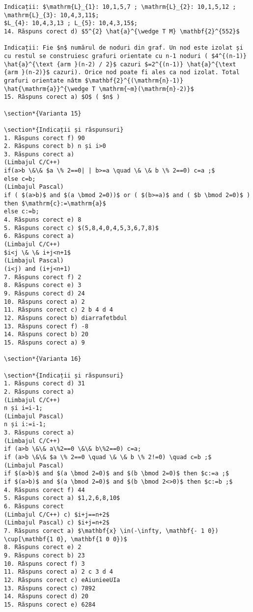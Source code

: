 \begin{verbatim}
Indicații: $\mathrm{L}_{1}: 10,1,5,7 ; \mathrm{L}_{2}: 10,1,5,12 ; \mathrm{L}_{3}: 10,4,3,11$;
$L_{4}: 10,4,3,13 ; L_{5}: 10,4,3,15$;
14. Răspuns corect d) $5^{2} \hat{a}^{\wedge T M} \mathbf{2}^{552}$

Indicații: Fie $n$ numărul de noduri din graf. Un nod este izolat și cu restul se construiesc grafuri orientate cu n-1 noduri ( $4^{(n-1)} \hat{a}^{\text {arm }(n-2) / 2}$ cazuri $=2^{(n-1)} \hat{a}^{\text {arm }(n-2)}$ cazuri). Orice nod poate fi ales ca nod izolat. Total grafuri orientate nâtm $\mathbf{2}^{(\mathrm{n}-1)} \hat{\mathrm{a}}^{\wedge T \mathrm{~m}(\mathrm{n}-2)}$
15. Răspuns corect a) $O$ ( $n$ )

\section*{Varianta 15}

\section*{Indicații și răspunsuri}
1. Răspuns corect f) 90
2. Răspuns corect b) n și i>0
3. Răspuns corect a)
(Limbajul C/C++)
if(a>b \&\& $a \% 2==0| | b>=a \quad \& \& b \% 2==0) c=a ;$
else c=b;
(Limbajul Pascal)
if ( $(a>b)$ and $(a \bmod 2=0))$ or ( $(b>=a)$ and ( $b \bmod 2=0)$ )
then $\mathrm{c}:=\mathrm{a}$
else c:=b;
4. Răspuns corect e) 8
5. Răspuns corect c) $(5,8,4,0,4,5,3,6,7,8)$
6. Răspuns corect a)
(Limbajul C/C++)
$i<j \& \& i+j<n+1$
(Limbajul Pascal)
(i<j) and (i+j<n+1)
7. Răspuns corect f) 2
8. Răspuns corect e) 3
9. Răspuns corect d) 24
10. Răspuns corect a) 2
11. Răspuns corect c) 2 b 4 d 4
12. Răspuns corect b) diarrafetbdul
13. Răspuns corect f) -8
14. Răspuns corect b) 20
15. Răspuns corect a) 9

\section*{Varianta 16}

\section*{Indicații și răspunsuri}
1. Răspuns corect d) 31
2. Răspuns corect a)
(Limbajul C/C++)
n și i=i-1;
(Limbajul Pascal)
n și i:=i-1;
3. Răspuns corect a)
(Limbajul C/C++)
if (a>b \&\& a\%2==0 \&\& b\%2==0) c=a;
if (a>b \&\& $a \% 2==0 \quad \& \& b \% 2!=0) \quad c=b ;$
(Limbajul Pascal)
if $(a>b)$ and $(a \bmod 2=0)$ and $(b \bmod 2=0)$ then $c:=a ;$
if $(a>b)$ and $(a \bmod 2=0)$ and $(b \bmod 2<>0)$ then $c:=b ;$
4. Răspuns corect f) 44
5. Răspuns corect a) $1,2,6,8,10$
6. Răspuns corect
(Limbajul C/C++) c) $i+j==n+2$
(Limbajul Pascal) c) $i+j=n+2$
7. Răspuns corect a) $\mathbf{x} \in(-\infty, \mathbf{- 1 0}) \cup[\mathbf{1 0}, \mathbf{1 0 0})$
8. Răspuns corect e) 2
9. Răspuns corect b) 23
10. Răspuns corect f) 3
11. Răspuns corect a) 2 c 3 d 4
12. Răspuns corect c) eAiunieeUIa
13. Răspuns corect c) 7892
14. Răspuns corect d) 20
15. Răspuns corect e) 6284


\end{verbatim}
